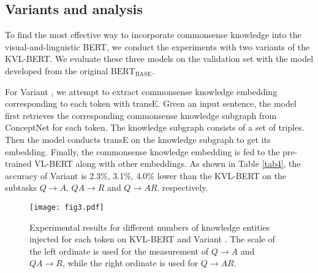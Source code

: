 \documentclass[conference]{IEEEtran}
\begin{document}
\subsection{Variants and analysis}\label{4.5}
To find the most effective way to incorporate commonsense knowledge into the visual-and-linguistic BERT, we conduct the experiments with two variants of the KVL-BERT. We evaluate these three models on the validation set with the model developed from the original $\mathrm{BERT}_{\mathrm{BASE}}$.











For Variant \uppercase\expandafter{}, we attempt to extract commonsense knowledge embedding corresponding to each token with transE. Given an input sentence, the model first retrieves the corresponding commonsense knowledge subgraph from ConceptNet for each token. The knowledge subgraph consists of a set of triples. Then the model conducts transE on the knowledge subgraph to get its embedding. Finally, the commonsense knowledge embedding is fed to the pre-trained VL-BERT \cite{b14} along with other embeddings. As shown in Table \ref{tab4}, the accuracy of Variant \uppercase\expandafter{} is 2.3\%, 3.1\%, 4.0\% lower than the KVL-BERT on the subtasks $Q \rightarrow A$, $QA \rightarrow R$ and $Q \rightarrow AR$, respectively.  



\begin{figure}[htp]
  \centering
  \texttt{[image: fig3.pdf]}\\
  \caption{Experimental results for different numbers of knowledge entities injected for each token on KVL-BERT and Variant \uppercase\expandafter{}. The scale of the left ordinate is used for the measurement of $Q \rightarrow A$ and $QA \rightarrow R$, while the right ordinate is used for $Q \rightarrow AR$.}
  
  
  
 
  \label{fig3}
\end{figure}
\end{document}
